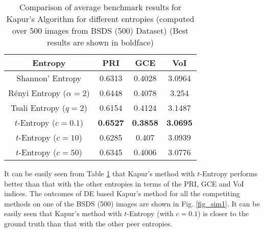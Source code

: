 \documentclass{article}
\begin{document}
\begin{table}[htb]
\centering
\caption{ Comparison of average benchmark results for Kapur's Algorithm for 
different entropies (computed over 500 images from
BSDS (500) Dataset) (Best results are shown in boldface)}
\label{tab avg bsds}
\begin{tabular}{cccc}
\hline
Entropy & PRI & GCE & VoI\\
\hline
Shannon' Entropy & 0.6313 & 0.4028 & 3.0964\\
R\'enyi Entropy ($\alpha=2$) & 0.6448 & 0.4078 & 3.254\\
Tsali Entropy ($q=2$) & 0.6154 & 0.4124 & 3.1487 \\
$t$-Entropy ($c=0.1$) & \textbf{0.6527} & \textbf{0.3858} & \textbf{3.0695}\\
$t$-Entropy ($c=10$) & 0.6285 & 0.407 & 3.0939\\
$t$-Entropy ($c=50$) & 0.6345 & 0.4006 & 3.0776
\\ \hline
\end{tabular}
\end{table}

It can be easily seen from Table \ref{tab avg bsds} that Kapur's method with $t$-Entropy performs better than that with the other entropies in terms of the PRI, GCE and VoI indices. The outcomes of DE based Kapur's method for all the competiting methods on one of the BSDS (500) images are shown in Fig. \ref{fig_sim1}. It can be easily seen that Kapur's method with $t$-Entropy (with $c=0.1$) is closer to the ground truth than that with the other peer entropies.
\end{document}
